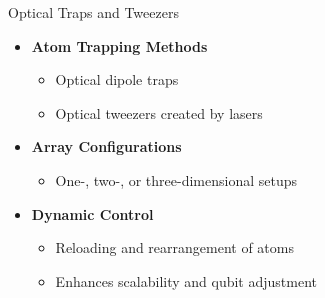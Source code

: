 \documentclass{beamer}
\begin{document}
\begin{frame}{Optical Traps and Tweezers}
  \begin{itemize}
    \item \textbf{Atom Trapping Methods}
      \begin{itemize}
        \item Optical dipole traps
        \item Optical tweezers created by lasers
      \end{itemize}
    \item \textbf{Array Configurations}
      \begin{itemize}
        \item One-, two-, or three-dimensional setups
      \end{itemize}
    \item \textbf{Dynamic Control}
      \begin{itemize}
        \item Reloading and rearrangement of atoms
        \item Enhances scalability and qubit adjustment
      \end{itemize}
  \end{itemize}
\end{frame}
\end{document}
